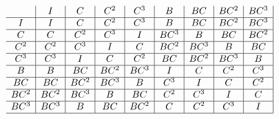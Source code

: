 \documentclass[../gatm.tex]{subfiles}
\begin{document}
$$\begin{array}{c|c|c|c|c|c|c|c|c|}
& I & C & C^2 & C^3 & B & BC & BC^2 & BC^3 \\ \hline
I & I & C & C^2 & C^3 & B & BC & BC^2 & BC^3 \\ \hline
C & C & C^2 & C^3 & I & BC^3 & B & BC & BC^2 \\ \hline
C^2 & C^2 & C^3 & I & C & BC^2 & BC^3 & B & BC \\ \hline
C^3 & C^3 & I & C & C^2 & BC & BC^2 & BC^3 & B \\ \hline
B & B & BC & BC^2 & BC^3 & I & C & C^2 & C^3 \\ \hline
BC & BC & BC^2 & BC^3 & B & C^3 & I & C & C^2 \\ \hline
BC^2 & BC^2 & BC^3 & B & BC & C^2 & C^3 & I & C \\ \hline
BC^3 & BC^3 & B & BC & BC^2 & C & C^2 & C^3 & I \\ \hline
\end{array}$$
\end{document}
